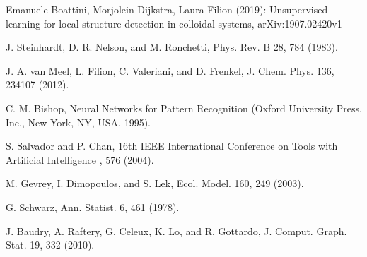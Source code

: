 \documentclass{article}
\begin{document}
\begin{thebibliography}{9}
Emanuele Boattini, Morjolein Dijkstra, Laura Filion (2019): Unsupervised learning for local structure detection in colloidal systems, arXiv:1907.02420v1

J. Steinhardt, D. R. Nelson, and M. Ronchetti, Phys. Rev. B 28, 784 (1983).

J. A. van Meel, L. Filion, C. Valeriani, and D. Frenkel, J. Chem. Phys. 136,
234107 (2012).

C. M. Bishop, Neural Networks for Pattern Recognition (Oxford University Press, Inc., New York, NY, USA, 1995).

S. Salvador and P. Chan, 16th IEEE International Conference on Tools with Artificial Intelligence , 576 (2004).

M. Gevrey, I. Dimopoulos, and S. Lek, Ecol. Model. 160, 249 (2003).

G. Schwarz, Ann. Statist. 6, 461 (1978).

J. Baudry, A. Raftery, G. Celeux, K. Lo, and R. Gottardo, J. Comput. Graph. Stat. 19, 332 (2010).

\end{thebibliography}
\end{document}
